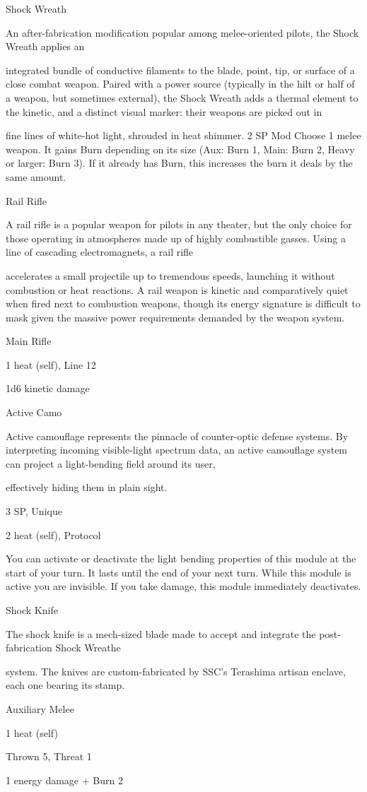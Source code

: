 Shock Wreath  

An after-fabrication modification popular among melee-oriented pilots, the Shock Wreath applies an  

integrated bundle of conductive filaments to the blade, point, tip, or surface of a close combat weapon.  
Paired with a power source (typically in the hilt or half of a weapon, but sometimes external), the Shock  
Wreath adds a thermal element to the kinetic, and a distinct visual marker: their weapons are picked out in  

fine lines of white-hot light, shrouded in heat shimmer.     
2 SP  
Mod  
Choose 1 melee weapon. It gains Burn depending on its size (Aux: Burn 1, Main: Burn 2, Heavy  
or larger: Burn 3). If it already has Burn, this increases the burn it deals by the same amount.
 

Rail Rifle  

A rail rifle is a popular weapon for pilots in any theater, but the only choice for those operating in  
atmospheres made up of highly combustible gasses. Using a line of cascading electromagnets, a rail rifle  

accelerates a small projectile up to tremendous speeds, launching it without combustion or heat reactions.  
A rail weapon is kinetic and comparatively quiet when fired next to combustion weapons, though its energy  
signature is difficult to mask given the massive power requirements demanded by the weapon system.   

Main Rifle
 
1 heat (self), Line 12
 
1d6 kinetic damage
 

Active Camo  

Active camouflage represents the pinnacle of counter-optic defense systems. By interpreting incoming  
visible-light spectrum data, an active camouflage system can project a light-bending field around its user,  

effectively hiding them in plain sight.    

3 SP, Unique  

2 heat (self), Protocol
 

                                                                                                                   


You can activate or deactivate the light bending properties of this module at the start of your  
turn. It lasts until the end of your next turn. While this module is active you are invisible. If you  
take damage, this module immediately deactivates.
 

Shock Knife
 
The shock knife is a mech-sized blade made to accept and integrate the post-fabrication Shock Wreathe  

system. The knives are custom-fabricated by SSC’s Terashima artisan enclave, each one bearing its stamp.  

Auxiliary Melee
 
1 heat (self)
 
Thrown 5, Threat 1
 
1 energy damage + Burn 2
 
